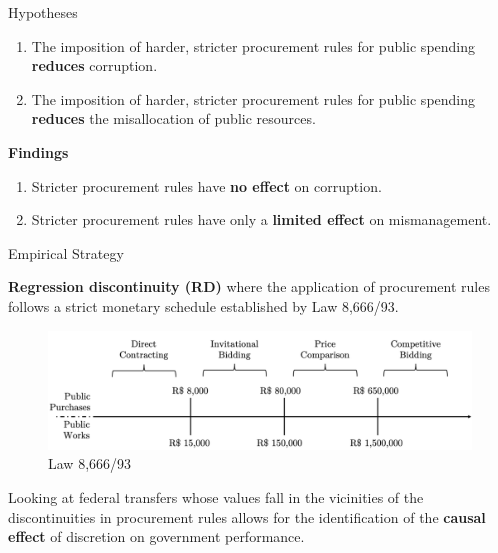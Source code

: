\documentclass[10pt,ignorenonframetext,]{beamer}
\begin{document}
\begin{frame}{Hypotheses}
\protect\hypertarget{hypotheses}{}

\begin{enumerate}
\item
  The imposition of harder, stricter procurement rules for public
  spending \textbf{reduces} corruption.
\item
  The imposition of harder, stricter procurement rules for public
  spending \textbf{reduces} the misallocation of public resources.
\end{enumerate}

\textbf{Findings}

\begin{enumerate}
\item
  Stricter procurement rules have \textbf{no effect} on corruption.
\item
  Stricter procurement rules have only a \textbf{limited effect} on
  mismanagement.
\end{enumerate}

\end{frame}

\begin{frame}{Empirical Strategy}
\protect\hypertarget{empirical-strategy}{}

\textbf{Regression discontinuity (RD)} where the application of
procurement rules follows a strict monetary schedule established by Law
8,666/93.

\begin{figure}
\centering
\includegraphics{./images/procurement_schedule.png}
\caption{Law 8,666/93}
\end{figure}

Looking at federal transfers whose values fall in the vicinities of the
discontinuities in procurement rules allows for the identification of
the \textbf{causal effect} of discretion on government performance.

\end{frame}
\end{document}
